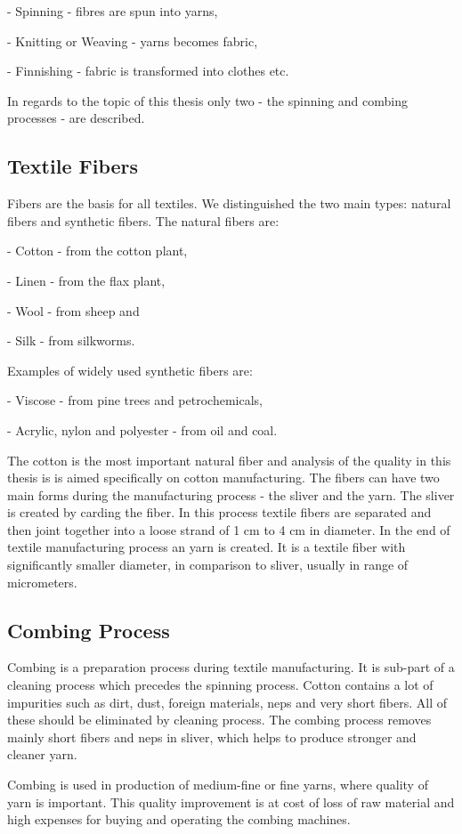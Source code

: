 \documentclass[twoside]{ctuthesis}
\theoremstyle{plain}
\theoremstyle{definition}
\theoremstyle{note}
\begin{document}
- Spinning - fibres are spun into yarns,

- Knitting or Weaving - yarns becomes fabric,

- Finnishing - fabric is transformed into clothes etc.

In regards to the topic of this thesis only two - the spinning and combing processes - are described.
\subsection{Textile Fibers}
Fibers are the basis for all textiles. We distinguished the two main types: natural fibers and synthetic fibers. The natural fibers are:

- Cotton - from the cotton plant,

- Linen - from the flax plant,

- Wool - from sheep and

- Silk - from silkworms.

Examples of widely used synthetic fibers are:

- Viscose - from pine trees and petrochemicals,

- Acrylic, nylon and polyester - from oil and coal. 

The cotton is the most important natural fiber and analysis of the quality in this thesis is is aimed specifically on cotton manufacturing. 
The fibers can have two main forms during the manufacturing process - the sliver and the yarn. The sliver is created by carding the fiber. In this process textile fibers are separated and then joint together into a loose strand of 1 cm to 4 cm in diameter. In the end of textile manufacturing process an yarn is created. It is a textile fiber with significantly smaller diameter, in comparison to sliver, usually in range of micrometers.
\subsection{Combing Process}
Combing is a preparation process during textile manufacturing. It is sub-part of a cleaning process which precedes the spinning process. Cotton contains a lot of impurities such as dirt, dust, foreign materials, neps and very short fibers. All of these should be eliminated by cleaning process. The combing process removes mainly short fibers and neps in sliver, which helps to produce stronger and cleaner yarn.

Combing is used in production of medium-fine or fine yarns, where quality of yarn is important. This quality improvement is at cost of loss of raw material and high expenses for buying and operating the combing machines. 
\end{document}
